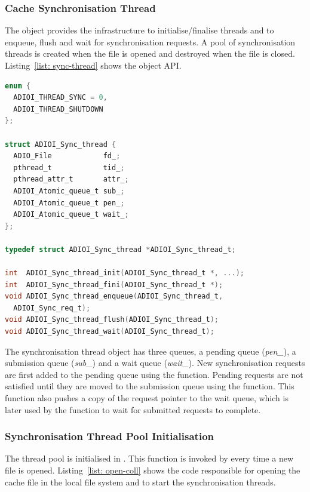 \subsubsection{Cache Synchronisation Thread}
\label{subsubsec: cache-sync-thread}
The  object provides the infrastructure to initialise/finalise threads and to enqueue, flush and wait for synchronisation requests. A pool of synchronisation threads is created when the file is opened and destroyed when the file is closed. Listing~\ref{list: sync-thread} shows the object API.

\begin{lstlisting}[language=C, caption=Synchronisation Thread API, label={list: sync-thread}]
enum {
  ADIOI_THREAD_SYNC = 0,
  ADIOI_THREAD_SHUTDOWN
};

struct ADIOI_Sync_thread {
  ADIO_File            fd_;
  pthread_t            tid_;
  pthread_attr_t       attr_;
  ADIOI_Atomic_queue_t sub_;
  ADIOI_Atomic_queue_t pen_;
  ADIOI_Atomic_queue_t wait_;
};

typedef struct ADIOI_Sync_thread *ADIOI_Sync_thread_t;

int  ADIOI_Sync_thread_init(ADIOI_Sync_thread_t *, ...);
int  ADIOI_Sync_thread_fini(ADIOI_Sync_thread_t *);
void ADIOI_Sync_thread_enqueue(ADIOI_Sync_thread_t, 
  ADIOI_Sync_req_t);
void ADIOI_Sync_thread_flush(ADIOI_Sync_thread_t);
void ADIOI_Sync_thread_wait(ADIOI_Sync_thread_t);
\end{lstlisting}

The synchronisation thread object has three queues, a pending queue (\textit{pen\_}), a submission queue (\textit{sub\_}) and a wait queue (\textit{wait\_}). New synchronisation requests are first added to the pending queue using the  function. Pending requests are not satisfied until they are moved to the submission queue using the  function. This function also pushes a copy of the request pointer to the wait queue, which is later used by the  function to wait for submitted requests to complete.

\subsubsection{Synchronisation Thread Pool Initialisation}
\label{subsubsec: thread-pool-init}
The thread pool is initialised in . This function is invoked by  every time a new file is opened. Listing~\ref{list: open-coll} shows the code responsible for opening the cache file in the local file system and to start the synchronisation threads.

